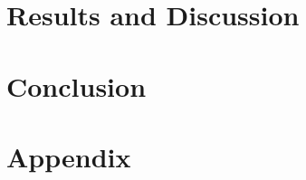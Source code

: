 \documentclass[runningheads]{llncs}
\newcommand{\version}{v3/}
\begin{document}
\section{Results and Discussion}\label{sec:resdis}
  
\section{Conclusion}\label{sec:conc}
  

  
%  
  
\section{Appendix}
  
\end{document}
